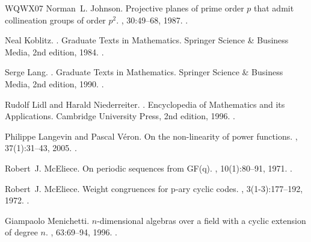 \documentclass[12pt]{article}
\begin{document}
\begin{thebibliography}{WQWX07}
Norman~L. Johnson.
\newblock Projective planes of prime order $p$ that admit collineation groups
  of order $p^2$.
, 30:49--68, 1987.
\newblock \href {https://doi.org/10.1007/BF01223263}
  {}.

Neal Koblitz.
.
\newblock Graduate Texts in Mathematics. Springer Science \& Business Media,
  2nd edition, 1984.
\newblock \href {https://doi.org/10.1007/978-1-4612-1112-9}
  {}.

Serge Lang.
.
\newblock Graduate Texts in Mathematics. Springer Science \& Business Media,
  2nd edition, 1990.
\newblock \href {https://doi.org/10.1007/978-1-4612-0987-4}
  {}.

Rudolf Lidl and Harald Niederreiter.
.
\newblock Encyclopedia of Mathematics and its Applications. Cambridge
  University Press, 2nd edition, 1996.
\newblock \href {https://doi.org/10.1017/CBO9780511525926}
  {}.

Philippe Langevin and Pascal V{\'{e}}ron.
\newblock On the non-linearity of power functions.
, 37(1):31--43, 2005.
\newblock \href {https://doi.org/10.1007/S10623-004-3803-9}
  {}.

Robert~J. McEliece.
\newblock On periodic sequences from {GF(q)}.
, 10(1):80--91, 1971.
\newblock \href {https://doi.org/10.1016/0097-3165(71)90066-5}
  {}.

Robert~J. McEliece.
\newblock Weight congruences for p-ary cyclic codes.
, 3(1-3):177--192, 1972.
\newblock \href {https://doi.org/10.1016/0012-365X(72)90032-5}
  {}.

Giampaolo Menichetti.
\newblock $n$-dimensional algebras over a field with a cyclic extension of
  degree $n$.
, 63:69--94, 1996.
\newblock \href {https://doi.org/10.1007/BF00181186}
  {}.


\end{thebibliography}
\end{document}
